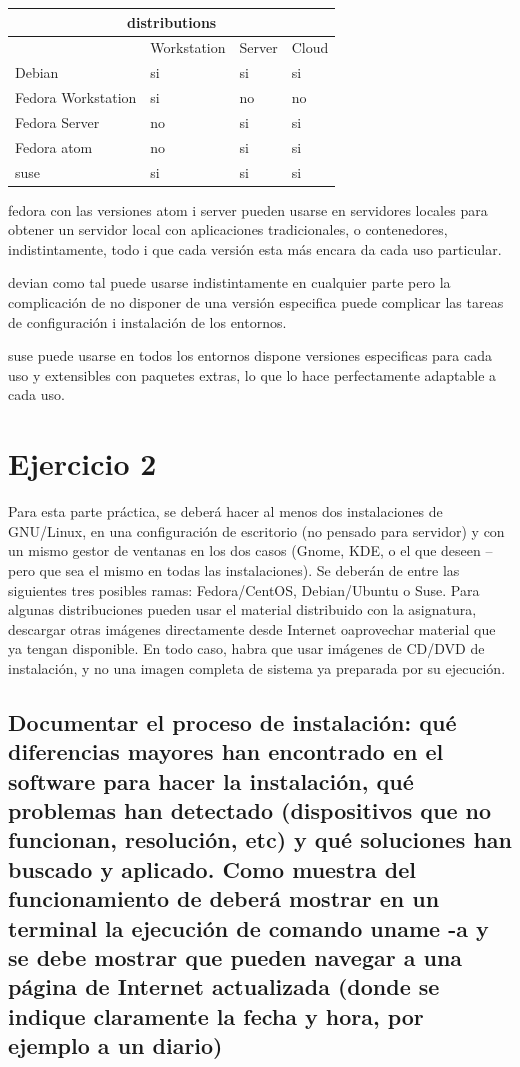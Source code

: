 \documentclass[preprint,11pt]{elsarticle}
\begin{document}
\begin{tabular}{ |p{4cm}||p{3cm}|p{3cm}|p{3cm}|  }
 \hline
 \multicolumn{4}{|c|}{distributions} \\
 \hline
  &Workstation  &Server  &Cloud \\
 \hline
Debian &si &si &si\\
Fedora Workstation  &si &no &no\\
Fedora Server &no &si &si\\
Fedora atom &no &si &si \\
suse &si &si &si \\
 \hline
\end{tabular}
\bigskip 

fedora con las versiones atom i server pueden usarse en servidores locales para obtener un servidor local con aplicaciones tradicionales, o contenedores, indistintamente, todo i que cada versión esta más encara da cada uso particular.\bigskip

devian como tal puede usarse indistintamente en cualquier parte pero la complicación de no disponer de una versión especifica puede complicar las tareas de configuración i instalación de los entornos.\bigskip

suse puede usarse en todos los entornos dispone versiones especificas para cada uso y extensibles con paquetes extras, lo que lo hace perfectamente adaptable a cada uso.\bigskip

\clearpage
\section{Ejercicio 2}
Para esta parte práctica, se deberá hacer al menos dos instalaciones de GNU/Linux, en una configuración de escritorio (no pensado para servidor) y con un mismo gestor de ventanas en los dos casos (Gnome, KDE, o el que deseen – pero que sea el mismo en todas las instalaciones). Se deberán de entre las siguientes tres posibles ramas: Fedora/CentOS, Debian/Ubuntu o Suse. Para algunas distribuciones pueden usar el material distribuido con la asignatura, descargar otras imágenes directamente desde Internet oaprovechar material que ya tengan disponible. En todo caso, habra que usar imágenes de CD/DVD de instalación, y no una imagen completa de sistema ya preparada por su ejecución.\bigskip

\subsection{Documentar el proceso de instalación: qué diferencias mayores han encontrado en el software para hacer la instalación, qué problemas han detectado (dispositivos que no funcionan, resolución, etc) y qué soluciones han buscado y aplicado. Como muestra del funcionamiento de deberá mostrar en un terminal la ejecución de comando uname -a y se debe mostrar que pueden navegar a una página de Internet actualizada (donde se indique claramente la fecha y hora, por ejemplo a un diario) }
\end{document}

